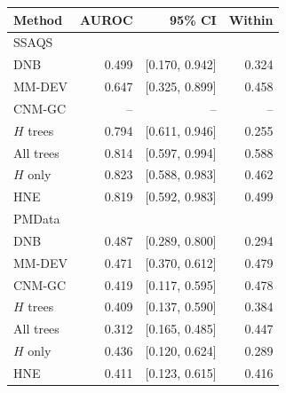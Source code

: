 \begin{tabular*}{\linewidth}{@{\extracolsep{\fill}}lrrr@{}}
\toprule
Method & AUROC & 95\% CI & Within \\
\midrule
\multicolumn{4}{l}{SSAQS} \\
\midrule
DNB & 0.499 & [0.170, 0.942] & 0.324 \\
MM-DEV & 0.647 & [0.325, 0.899] & 0.458 \\
CNM-GC & -- & -- & -- \\
$H$ trees & 0.794 & [0.611, 0.946] & 0.255 \\
All trees & 0.814 & [0.597, 0.994] & 0.588 \\
$H$ only & 0.823 & [0.588, 0.983] & 0.462 \\
HNE & 0.819 & [0.592, 0.983] & 0.499 \\
\midrule
\multicolumn{4}{l}{PMData} \\
\midrule
DNB & 0.487 & [0.289, 0.800] & 0.294 \\
MM-DEV & 0.471 & [0.370, 0.612] & 0.479 \\
CNM-GC & 0.419 & [0.117, 0.595] & 0.478 \\
$H$ trees & 0.409 & [0.137, 0.590] & 0.384 \\
All trees & 0.312 & [0.165, 0.485] & 0.447 \\
$H$ only & 0.436 & [0.120, 0.624] & 0.289 \\
HNE & 0.411 & [0.123, 0.615] & 0.416 \\
\bottomrule
\end{tabular*}